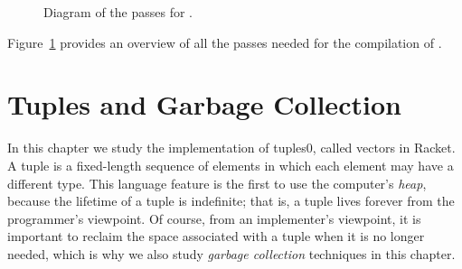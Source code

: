 \documentclass[7x10]{TimesAPriori_MIT}%
\def\racketEd{0}
\def\edition{1}
\newcommand{\racket}[1]{{\if\edition\racketEd{#1}\fi}}
\numberwithin{theorem}{chapter}
\numberwithin{definition}{chapter}
\numberwithin{equation}{chapter}
\begin{document}
\begin{figure}[p]
\begin{tcolorbox}[colback=white]
{
\fi}
\end{tcolorbox}

\caption{Diagram of the passes for \LangLoop{}.}
\label{fig:Lwhile-passes}
\end{figure}

Figure~\ref{fig:Lwhile-passes} provides an overview of all the passes needed
for the compilation of \LangLoop{}.






\chapter{Tuples and Garbage Collection}
\label{ch:Lvec}
\setcounter{footnote}{0}


In this chapter we study the implementation of tuples\racket{, called
  vectors in Racket}.  A tuple is a fixed-length sequence of elements
in which each element may have a different type.
%
This language feature is the first to use the computer's
\emph{heap}, because the lifetime of a tuple is
indefinite; that is, a tuple lives forever from the programmer's
viewpoint. Of course, from an implementer's viewpoint, it is important
to reclaim the space associated with a tuple when it is no longer
needed, which is why we also study \emph{garbage collection}
 techniques in this chapter.
\end{document}
